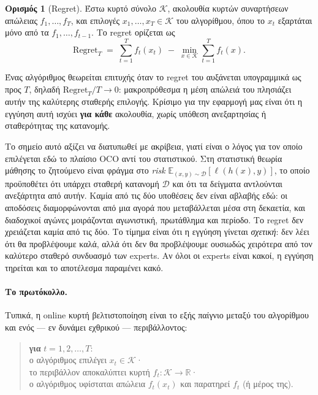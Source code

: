 \documentclass[12pt,a4paper,oneside]{report}
\renewcommand{\_}{\oldunderscore\allowbreak}
\theoremstyle{definition}
\newtheorem{definition}{Ορισμός}[chapter]
\theoremstyle{plain}
\theoremstyle{remark}
\begin{document}
\begin{definition}[Regret]
Έστω κυρτό σύνολο $\mathcal{K}$, ακολουθία κυρτών συναρτήσεων απώλειας $f_1,\dots,f_T$, και
επιλογές $x_1,\dots,x_T \in \mathcal{K}$ του αλγορίθμου, όπου το $x_t$ εξαρτάται μόνο από τα
$f_1,\dots,f_{t-1}$. Το regret ορίζεται ως
\[
\mathrm{Regret}_T \;=\; \sum_{t=1}^{T} f_t(x_t) \;-\; \min_{x \in \mathcal{K}} \sum_{t=1}^{T} f_t(x).
\]
\end{definition}

Ένας αλγόριθμος θεωρείται επιτυχής όταν το regret του αυξάνεται υπογραμμικά ως προς $T$,
δηλαδή $\mathrm{Regret}_T / T \to 0$: μακροπρόθεσμα η μέση απώλειά του πλησιάζει αυτήν της
καλύτερης σταθερής επιλογής. Κρίσιμο για την εφαρμογή μας είναι ότι η εγγύηση αυτή ισχύει
\textbf{για κάθε} ακολουθία, χωρίς υπόθεση ανεξαρτησίας ή σταθερότητας της κατανομής.

Το σημείο αυτό αξίζει να διατυπωθεί με ακρίβεια, γιατί είναι ο λόγος για τον οποίο
επιλέγεται εδώ το πλαίσιο OCO αντί του στατιστικού. Στη στατιστική θεωρία μάθησης το
ζητούμενο είναι φράγμα στο \emph{risk} $\mathbb{E}_{(x,y)\sim\mathcal{D}}[\ell(h(x),y)]$, το
οποίο προϋποθέτει ότι υπάρχει σταθερή κατανομή $\mathcal{D}$ και ότι τα δείγματα αντλούνται
ανεξάρτητα από αυτήν. Καμία από τις δύο υποθέσεις δεν είναι αβλαβής εδώ: οι αποδόσεις
διαμορφώνονται από μια αγορά που μεταβάλλεται μέσα στη δεκαετία, και διαδοχικοί αγώνες
μοιράζονται αγωνιστική, πρωτάθλημα και περίοδο. Το regret δεν χρειάζεται καμία από τις δύο.
Το τίμημα είναι ότι η εγγύηση γίνεται \emph{σχετική}: δεν λέει ότι θα προβλέψουμε καλά, αλλά
ότι δεν θα προβλέψουμε ουσιωδώς χειρότερα από τον καλύτερο σταθερό συνδυασμό των experts.
Αν όλοι οι experts είναι κακοί, η εγγύηση τηρείται και το αποτέλεσμα παραμένει κακό.

\paragraph{Το πρωτόκολλο.} Τυπικά, η online κυρτή βελτιστοποίηση είναι το εξής παίγνιο
μεταξύ του αλγορίθμου και ενός --- εν δυνάμει εχθρικού --- περιβάλλοντος:

\begin{quote}
\textbf{για} $t = 1,2,\dots,T$:\\[2pt]
\hspace*{1em} ο αλγόριθμος επιλέγει $x_t \in \mathcal{K}$·\\
\hspace*{1em} το περιβάλλον αποκαλύπτει κυρτή $f_t : \mathcal{K}\to\mathbb{R}$·\\
\hspace*{1em} ο αλγόριθμος υφίσταται απώλεια $f_t(x_t)$ και παρατηρεί $f_t$ (ή μέρος της).
\end{quote}
\end{document}
